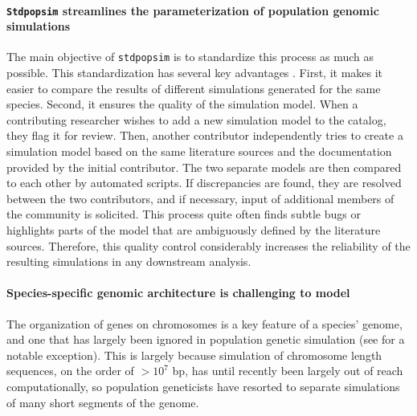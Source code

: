 \documentclass[hidelinks]{article}
\newcommand{\Stdpopsim}{\texttt{Stdpopsim}\xspace}
\newcommand{\stdpopsim}{\texttt{stdpopsim}\xspace}
\begin{document}
\paragraph*{\Stdpopsim streamlines the parameterization of population genomic simulations}
The main objective of \stdpopsim is to standardize this process as much as possible.
This standardization has several key advantages \citep{Adrion2020}. First, it makes it easier to compare the results of different
simulations generated for the same species. 
Second, it ensures the quality of the simulation model.
When a contributing researcher wishes to add a new simulation model to the catalog,
they flag it for review. Then, another contributor independently tries to create a simulation model based on the same literature sources and the documentation provided by the initial contributor. The two separate models are then
compared to each other by automated scripts. If discrepancies are found, they
are resolved between the two contributors, and if necessary, input of additional members of the community is solicited. This process quite often
finds subtle bugs  \citep{Ragsdale2020} or highlights parts of the model that are
ambiguously defined by the literature sources.
Therefore, this quality control considerably increases the reliability of the
resulting simulations in any downstream analysis.


\paragraph*{%
  \textbf{Species-specific genomic architecture is challenging to model}}
The organization of genes on chromosomes is a key feature of a species' genome,
and one that has largely been ignored in population genetic simulation (see \cite{schrider2020background} for a notable exception).
This is largely because simulation of chromosome length sequences, on the order of $ > 10^7$ bp,
has until recently been largely out of reach computationally, 
so population geneticists have resorted to separate simulations of many short segments
of the genome.
\end{document}
